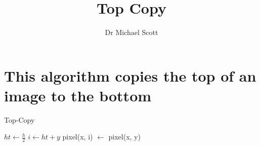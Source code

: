 \documentclass{../../../fal_assignment}
\title{Top Copy}
\author{Dr Michael Scott}
\begin{document}
\maketitle

	\section{This algorithm copies the top of an image to the bottom}
	\begin{algorithm}[ht]
	\caption{Top-Copy}
	\label{alg:algorithm}
	
	\begin{algorithmic}[1]
		   \State $ht \leftarrow \frac{h}{2}$
			\State $i \leftarrow ht + y$
			\State pixel(x, i) $\leftarrow$ pixel(x, y)
			\EndFor
	\end{algorithmic}
	
\end{algorithm}
\end{document}
